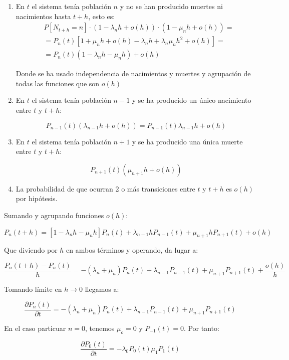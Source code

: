 \documentclass[a4paper,10pt]{scrartcl}
\theoremstyle{definition}
\numberwithin{equation}{section}
\begin{document}
\begin{enumerate}
 \item En $t$ el sistema tenía población $n$ y no se han producido muertes ni nacimientos hasta $t+h$, esto es:
 \begin{align*}
  &  P[N_{t+h}=n] \cdot (1-\lambda_n h + o(h)) \cdot (1-\mu_n h + o(h))= \\
  &= P_n(t)[1+\mu_n h + o(h) -\lambda_n h + \lambda_n \mu_n h^2 + o(h)] = \\
  &= P_n(t)(1-\lambda_n h - \mu_n h) + o(h)
 \end{align*}
 
 Donde se ha usado independencia de nacimientos y muertes y agrupación de todas las funciones que son $o(h)$
 
 \item En $t$ el sistema tenía población $n-1$ y se ha producido un único nacimiento entre $t$ y $t+h$:
 
 \[P_{n-1}(t) (\lambda_{n-1}h + o(h)) = P_{n-1}(t) \lambda_{n-1} h + o(h)\]
 
 \item En $t$ el sistema tenía población $n+1$ y se ha producido una única muerte entre $t$ y $t+h$:
 
 \[P_{n+1}(t) (\mu_{n+1} h + o(h))\]
 
 \item La probabilidad de que ocurran 2 o más transiciones entre $t$ y $t+h$ es $o(h)$ por hipótesis.
\end{enumerate}


Sumando y agrupando funciones $o(h)$:

\[P_n(t+h) = [1-\lambda_n h -\mu_n h] P_n(t) + \lambda_{n-1} h P_{n-1}(t) + \mu_{n+1} h P_{n+1}(t) + o(h)\]


Que diviendo por $h$ en ambos términos y operando, da lugar a:

\[\frac{P_n(t+h) - P_n(t)}{h} = -(\lambda_n + \mu_n) P_n(t) + \lambda_{n-1} P_{n-1}(t) + \mu_{n+1}P_{n+1}(t) + \frac{o(h)}{h}\]

Tomando límite en $h\rightarrow 0$ llegamos a:

\begin{equation}
\frac{\partial P_n(t)}{\partial t} = -(\lambda_n + \mu_n) P_n(t) + \lambda_{n-1}P_{n-1}(t) + \mu_{n+1}P_{n+1}(t)
\label{eq:recpn(t)}
\end{equation}

En el caso particuar $n=0$, tenemos $\mu_o = 0$ y $P_{-1}(t) = 0$. Por tanto:

\begin{equation}
 \frac{\partial P_0(t)}{\partial t} = -\lambda_0 P_0(t) \mu_{1}P_{1}(t)
 \label{eq:recp0(t)}
\end{equation}
\end{document}
